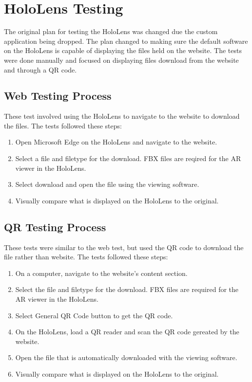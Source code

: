 \section{HoloLens Testing}
The original plan for testing the HoloLens was changed due the custom application being dropped.
The plan changed to making sure the default software on the HoloLens is capable of displaying the files held on the website. The tests were done manually and focused on displaying files download from the website and through a QR code.

    \subsection{Web Testing Process}
    These test involved using the HoloLens to navigate to the website to download the files. The tests followed these steps:

    \begin{enumerate}
        \item Open Microsoft Edge on the HoloLens and navigate to the website.
        \item Select a file and filetype for the download. FBX files are reqired for the AR viewer in the HoloLens.
        \item Select download and open the file using the viewing software.
        \item Visually compare what is displayed on the HoloLens to the original.
    \end{enumerate}

    \subsection{QR Testing Process}
    These tests were similar to the web test, but used the QR code to download the file rather than website. The tests followed these steps:
    
    \begin{enumerate}
        \item On a computer, navigate to the website's content section.
        \item Select the file and filetype for the download. FBX files are required for the AR viewer in the HoloLens.
        \item Select General QR Code button to get the QR code.
        \item On the HoloLens, load a QR reader and scan the QR code gereated by the website.
        \item Open the file that is automatically downloaded with the viewing software.
        \item Visually compare what is displayed on the HoloLens to the original.
    \end{enumerate}

